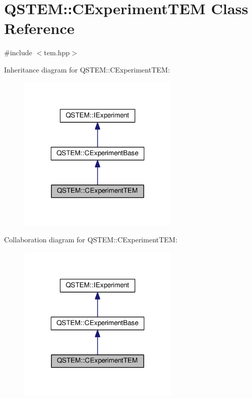 \hypertarget{class_q_s_t_e_m_1_1_c_experiment_t_e_m}{\section{Q\-S\-T\-E\-M\-:\-:C\-Experiment\-T\-E\-M Class Reference}
\label{class_q_s_t_e_m_1_1_c_experiment_t_e_m}
}


{\ttfamily \#include $<$tem.\-hpp$>$}



Inheritance diagram for Q\-S\-T\-E\-M\-:\-:C\-Experiment\-T\-E\-M\-:
\nopagebreak
\begin{figure}[H]
\begin{center}
\leavevmode
\includegraphics[width=216pt]{class_q_s_t_e_m_1_1_c_experiment_t_e_m__inherit__graph}
\end{center}
\end{figure}


Collaboration diagram for Q\-S\-T\-E\-M\-:\-:C\-Experiment\-T\-E\-M\-:
\nopagebreak
\begin{figure}[H]
\begin{center}
\leavevmode
\includegraphics[width=216pt]{class_q_s_t_e_m_1_1_c_experiment_t_e_m__coll__graph}
\end{center}
\end{figure}
